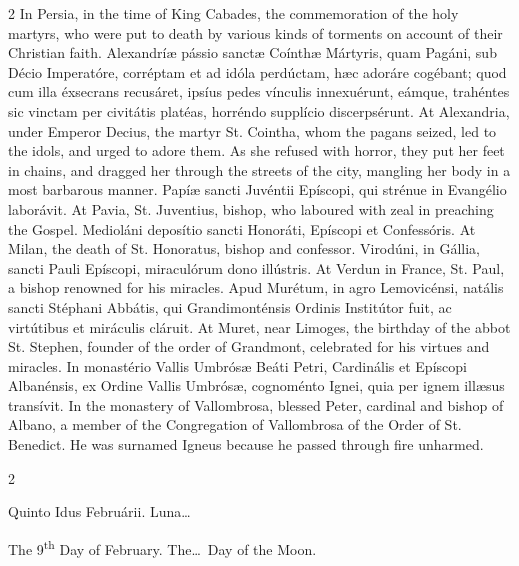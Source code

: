 \begin{paracol}{2}
In Persia, in the time of King Cabades, the commemoration of the holy 
 martyrs, who were put to death by various kinds of torments on account of 
 their Christian faith.
\switchcolumn*
{}
Alexandríæ pássio sanctæ Coínthæ Mártyris, quam 
 Pagáni, sub Décio Imperatóre, corréptam et ad idóla perdúctam, hæc adoráre 
 cogébant; quod cum illa éxsecrans recusáret, ipsíus pedes vínculis 
 innexuérunt, eámque, trahéntes sic vinctam per civitátis platéas, horréndo 
 supplício discerpsérunt.
\switchcolumn
{}
At Alexandria, under Emperor Decius, the martyr St. Cointha, whom the pagans 
 seized, led to the idols, and urged to adore them. As she refused with 
 horror, they put her feet in chains, and dragged her through the streets of 
 the city, mangling her body in a most barbarous manner.
\switchcolumn*
{}
Papíæ sancti Juvéntii Epíscopi, qui strénue in 
 Evangélio laborávit.
\switchcolumn
{}
At Pavia, St. Juventius, bishop, who laboured with zeal in preaching the 
 Gospel.
\switchcolumn*
{}
Medioláni deposítio sancti Honoráti, Epíscopi 
 et Confessóris.
\switchcolumn
{}
At Milan, the death of St. Honoratus, bishop and confessor.
\switchcolumn*
{}
Virodúni, in Gállia, sancti Pauli Epíscopi, miraculórum dono illústris.
\switchcolumn
{}
At Verdun in France, St. Paul, a bishop renowned for his miracles.
\switchcolumn*
{}
Apud Murétum, in agro Lemovicénsi, natális sancti Stéphani Abbátis, qui 
 Grandimonténsis Ordinis Institútor fuit, ac virtútibus et miráculis cláruit.
\switchcolumn
{}
At Muret, near Limoges, the birthday of the abbot St. Stephen, founder of 
 the order of Grandmont, celebrated for his virtues and miracles.
\switchcolumn*
{}
In monastério Vallis Umbrósæ Beáti Petri, 
 Cardinális et Epíscopi Albanénsis, ex Ordine Vallis Umbrósæ, cognoménto 
 Ignei, quia per ignem illæsus transívit.
\switchcolumn
{}
In the monastery of Vallombrosa, blessed Peter, cardinal and bishop of 
 Albano, a member of the Congregation of Vallombrosa of the Order of St. 
 Benedict. He was surnamed Igneus because he passed through fire 
 unharmed.
\switchcolumn*
{}
\end{paracol}


\begin{paracol}{2}
\begin{center}{\color{gregoriocolor} Quinto Idus Februárii. 
 Luna\dots\ }\end{center}
\switchcolumn
{}
\begin{center}{\color{gregoriocolor} The 9\textsuperscript{th} Day of 
 February. The\dots\ Day of the Moon.}\end{center}
\end{paracol}

